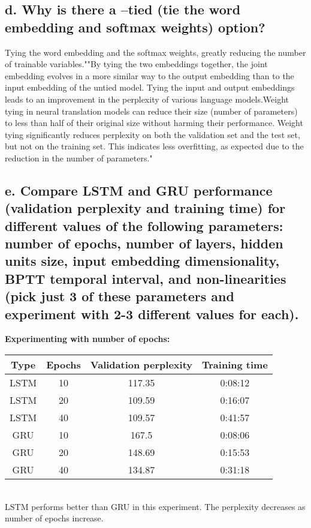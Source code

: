 \documentclass{article}
\begin{document}
\subsection*{d. Why is there a --tied (tie the word embedding and softmax weights) option?}
 Tying the word embedding and the softmax weights, greatly reducing the number of trainable
variables."\cite{Tie}"By tying the two embeddings together, the joint embedding evolves in a more similar way to the output embedding than to the input embedding of the untied model. Tying the input and output embeddings leads to an improvement in the perplexity of various language models.Weight tying
in neural translation models can reduce their size (number of parameters) to less than half of their original size without harming their performance. Weight tying
significantly reduces perplexity on both the validation set and the test set, but not on the training set. This indicates less overfitting, as expected
due to the reduction in the number of parameters."\cite{Tying_embeddings}
\subsection*{e. Compare LSTM and GRU performance (validation perplexity and training time) for different values of the following parameters: number of epochs, number of layers, hidden units size, input embedding dimensionality, BPTT temporal interval, and non-linearities (pick just 3 of these parameters and experiment with 2-3 different values for each).}

\textbf{Experimenting with number of epochs:}
\vspace{2pt} \\
\begin{tabular}[h]{cccc}
\hline Type &	Epochs & Validation perplexity & Training time\\
\hline 
LSTM	& 10	& 117.35	& 0:08:12\\
LSTM	& 20	& 109.59	& 0:16:07\\
LSTM	& 40	& 109.57	& 0:41:57\\
GRU	& 10	& 167.5	& 0:08:06\\
GRU	& 20	& 148.69 &	0:15:53\\
GRU	& 40	& 134.87 &	0:31:18\\
\hline
\end{tabular}
\vspace{4pt} \\

LSTM performs better than GRU in this experiment. The perplexity decreases as number of epochs increase.
\end{document}
